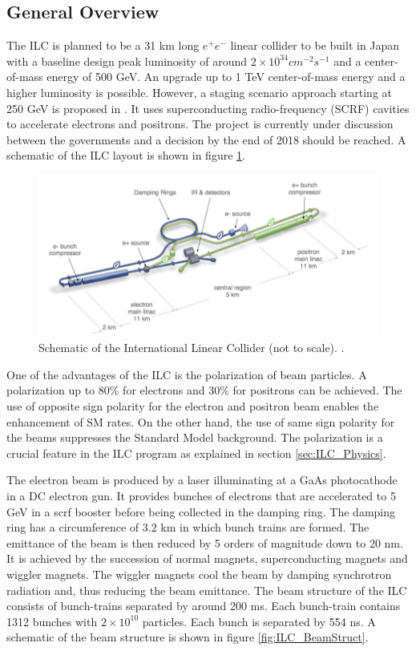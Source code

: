 \subsection{General Overview}

The ILC is planned to be a 31 km long $e^+e^-$ linear collider to be built in Japan with a baseline design peak luminosity of around $2 \times 10^{34} cm^{-2}s^{-1}$ and a center-of-mass energy of 500 GeV. An upgrade up to 1 TeV center-of-mass energy and a higher luminosity is possible. However, a staging scenario approach starting at 250 GeV is proposed in \cite{Fujii:2017vwa}. It uses superconducting radio-frequency (SCRF) cavities to accelerate electrons and positrons. The project is currently under discussion between the governments and a decision by the end of 2018 should be reached. A schematic of the ILC layout is shown in figure \ref{fig:ILC_schematic}.

\begin{figure}[htbp!]
  \centering
  \includegraphics[width=0.8\linewidth]{chap2/fig/ILC_schematic.png}
  \caption{Schematic of the International Linear Collider (not to scale). \cite{ILC_TDR_Vol1}.} \label{fig:ILC_schematic}
\end{figure}

One of the advantages of the ILC is the polarization of beam particles. A polarization up to 80\% for electrons and 30\% for positrons can be achieved. The use of opposite sign polarity for the electron and positron beam enables the enhancement of SM rates. On the other hand, the use of same sign polarity for the beams suppresses the Standard Model background. The polarization is a crucial feature in the ILC program as explained in section \ref{sec:ILC_Physics}.

The electron beam is produced by a laser illuminating at a GaAs photocathode in a DC electron gun. It provides bunches of electrons that are accelerated to 5 GeV in a \acrshort{scrf} booster before being collected in the damping ring. The damping ring has a circumference of 3.2 km in which bunch trains are formed. The emittance of the beam is then reduced by 5 orders of magnitude down to 20 nm. It is achieved by the succession of normal magnets, superconducting magnets and wiggler magnets. The wiggler magnets cool the beam by damping synchrotron radiation and, thus reducing the beam emittance. The beam structure of the ILC consists of bunch-trains separated by around 200 ms. Each bunch-train contains 1312 bunches with $2 \times 10^{10}$ particles. Each bunch is separated by 554 ns. A schematic of the beam structure is shown in figure \ref{fig:ILC_BeamStruct}.


